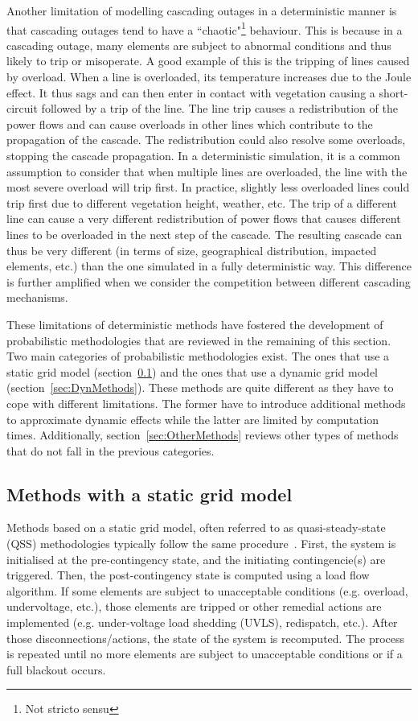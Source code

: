 Another limitation of modelling cascading outages in a deterministic manner is that cascading outages tend to have a ``chaotic"\footnote{Not stricto sensu} behaviour. This is because in a cascading outage, many elements are subject to abnormal conditions and thus likely to trip or misoperate. A good example of this is the tripping of lines caused by overload. When a line is overloaded, its temperature increases due to the Joule effect. It thus sags and can then enter in contact with vegetation causing a short-circuit followed by a trip of the line. The line trip causes a redistribution of the power flows and can cause overloads in other lines which contribute to the propagation of the cascade. The redistribution could also resolve some overloads, stopping the cascade propagation. In a deterministic simulation, it is a common assumption to consider that when multiple lines are overloaded, the line with the most severe overload will trip first. In practice, slightly less overloaded lines could trip first due to different vegetation height, weather, etc. The trip of a different line can cause a very different redistribution of power flows that causes different lines to be overloaded in the next step of the cascade. The resulting cascade can thus be very different (in terms of size, geographical distribution, impacted elements, etc.) than the one simulated in a fully deterministic way. This difference is further amplified when we consider the competition between different cascading mechanisms.

These limitations of deterministic methods have fostered the development of probabilistic methodologies that are reviewed in the remaining of this section. Two main categories of probabilistic methodologies exist. The ones that use a static grid model (section~\ref{sec:QSSmethods}) and the ones that use a dynamic grid model (section~\ref{sec:DynMethods}). These methods are quite different as they have to cope with different limitations. The former have to introduce additional methods to approximate dynamic effects while the latter are limited by computation times. Additionally, section~\ref{sec:OtherMethods} reviews other types of methods that do not fall in the previous categories.


\subsection{Methods with a static grid model}
\label{sec:QSSmethods}

Methods based on a static grid model, often referred to as quasi-steady-state (QSS) methodologies typically follow the same procedure~\cite{Benchmarking2018}. First, the system is initialised at the pre-contingency state, and the initiating contingencie(s) are triggered. Then, the post-contingency state is computed using a load flow algorithm. If some elements are subject to unacceptable conditions (e.g. overload, undervoltage, etc.), those elements are tripped or other remedial actions are implemented (e.g. under-voltage load shedding (UVLS), redispatch, etc.). After those disconnections/actions, the state of the system is recomputed. The process is repeated until no more elements are subject to unacceptable conditions or if a full blackout occurs.

